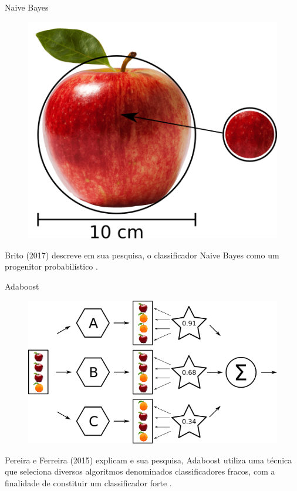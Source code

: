   \begin{frame}[fragile]{Naive Bayes}
    \begin{figure}[H]
        \begin{center}
            \includegraphics[scale=0.50]{images/naive_bayes.png}
        \end{center}
    \end{figure}
    Brito (2017) descreve em sua pesquisa, o classificador Naive Bayes como 
    um progenitor probabilístico \cite{de2017mineraccao}.
  \end{frame}

  \begin{frame}[fragile]{Adaboost}
    \begin{figure}[H]
        \begin{center}
            \includegraphics[scale=0.50]{images/adaboost.png}
        \end{center}
    \end{figure}

    Pereira e Ferreira (2015) explicam e sua pesquisa, Adaboost utiliza uma 
    técnica que seleciona diversos algoritmos denominados classificadores 
    fracos, com a finalidade de constituir um classificador forte 
    \cite{pereiraface}.
  \end{frame}

